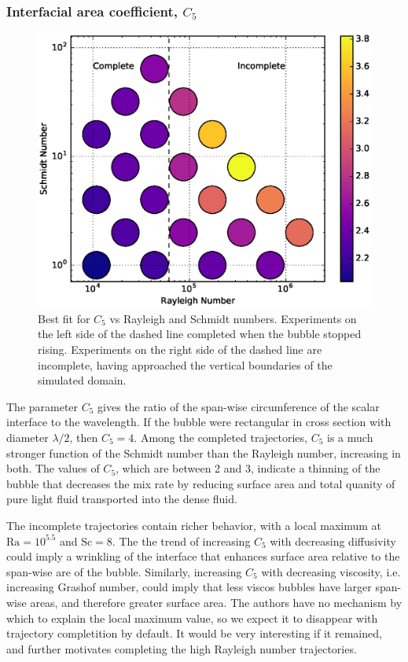 \subsubsection{Interfacial area coefficient, $C_5$}
\begin{figure}
\includegraphics[width=\columnwidth]{figs/C5-vs-Rayleigh-Schmidt}
\caption{ 
  Best fit for $C_5$ vs Rayleigh and Schmidt numbers.
  Experiments on the left side of the dashed line completed when the bubble stopped rising.
  Experiments on the right side of the dashed line are incomplete, having approached the vertical boundaries of the simulated domain.
}
\end{figure}

The parameter $C_5$ gives the ratio of the span-wise circumference of the scalar interface to the wavelength.
If the bubble were rectangular in cross section with diameter $\lambda / 2$, then $C_5 = 4$.
Among the completed trajectories, $C_5$ is a much stronger function of the Schmidt number than the Rayleigh number, increasing in both.
The values of $C_5$, which are between 2 and 3, indicate a thinning of the bubble that decreases the mix rate by reducing surface area and total quanity of pure light fluid transported into the dense fluid.

The incomplete trajectories contain richer behavior, with a local maximum at $\text{Ra} = 10^{5.5}$ and $\text{Sc} = 8$.
The the trend of increasing $C_5$ with decreasing diffusivity could imply a wrinkling of the interface that enhances surface area relative to the span-wise are of the bubble.
Similarly, increasing $C_5$ with decreasing viscosity, i.e. increasing Grashof number, could imply that less viscos bubbles have larger span-wise areas, and therefore greater surface area.
The authors have no mechanism by which to explain the local maximum value, so we expect it to disappear with trajectory completition by default.
It would be very interesting if it remained, and further motivates completing the high Rayleigh number trajectories.

